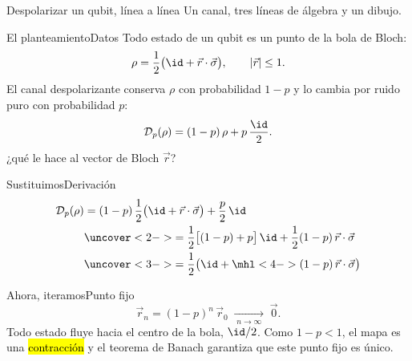 \documentclass[12pt]{beamer}
\begin{document}
  {Despolarizar un qubit, línea a línea}
  {Un canal, tres líneas de álgebra y un dibujo.}

\begin{frame}{El planteamiento}{Datos}
Todo estado de un qubit es un punto de la bola de Bloch:
\[
  \rho = \frac12\big(\id + \Vec r\cdot\Vec\sigma\big),
  \qquad |\Vec r| \le 1 .
\]
El canal despolarizante conserva $\rho$ con probabilidad $1-p$ y lo
cambia por ruido puro con probabilidad $p$:
\[
  \mathcal{D}_p(\rho) = (1-p)\,\rho + p\,\frac{\id}{2}.
\]
 ¿qué le hace al vector de Bloch $\Vec r$?
\end{frame}

\begin{frame}{Sustituimos}{Derivación}
{\large
\begin{align*}
  \mathcal{D}_p(\rho)
  &= (1-p)\,\frac12\big(\id + \Vec r\cdot\Vec\sigma\big) + \frac{p}{2}\,\id\\
  &\uncover<2->{= \frac12\big[(1-p) + p\big]\,\id + \frac12(1-p)\,\Vec r\cdot\Vec\sigma}\\
  &\uncover<3->{= \frac12\big(\id + \mhl<4->{(1-p)\,\Vec r}\cdot\Vec\sigma\big)}
\end{align*}}%
\end{frame}

\begin{frame}{Ahora, iteramos}{Punto fijo}
\[
  \Vec r_n = (1-p)^n\,\Vec r_0 \;\xrightarrow[\;n\to\infty\;]{}\; \Vec 0 .
\]
Todo estado fluye hacia el centro de la bola, $\id/2$. Como $1-p<1$, el
mapa es una \hl{contracción} y el teorema de Banach garantiza que este
punto fijo es único.
\begin{center}
\end{center}
\end{frame}
\end{document}
